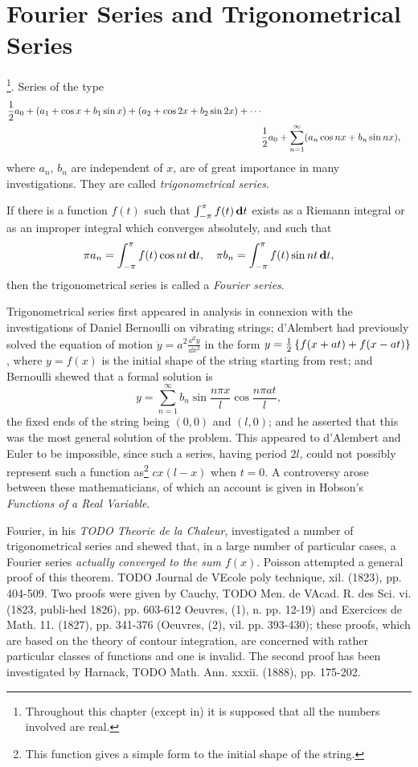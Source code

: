 %
%
\chapter{Fourier Series and Trigonometrical Series}
\footnote{Throughout
  this chapter (except in) it is supposed that all
  the numbers involved are real.}.
Series of the type
\begin{align*}
  \half a_{0}
  + (a_{1} + \cos x + b_{1} \sin x)
  + (a_{2} + \cos 2x + b_{2} \sin 2x)
  + \cdots
  \\
  &
  \hfill
  \half a_{0}
  +
  \sum_{n=1}^{\infty} ( a_{n} \cos nx + b_{n} \sin nx),
\end{align*}
where $a_{n}$, $b_{n}$ are independent of $x$, are of great importance in many
investigations. They are called \emph{trigonometrical series}.

If there is a function $f(t)$ such that
$\int_{-\pi}^{\pi} f(t) \, \mathbf{d} t$ exists as a Riemann
integral or as an improper integral which converges absolutely, and such that
$$
\pi a_{n} = \int_{-\pi}^{\pi} f(t) \cos nt \, \mathbf{d} t,
\quad
\pi b_{n} = \int_{-\pi}^{\pi} f(t) \sin nt \, \mathbf{d} t,
$$
then the trigonometrical series is called a \emph{Fourier series}.

Trigonometrical series first appeared in analysis in connexion with
the investigations of Daniel Bernoulli on vibrating strings;
d'Alembert had previously solved the equation of
motion
$ \ddot{y} = a^{2} \frac{\dd^{2} y}{\dd x^{2}}$
in the form
$y = \frac{1}{2} \left\{ f(x+at) + f(x-at) \right\}$, where $y=f(x)$ is
the initial shape of the string starting from rest;
and Bernoulli shewed that a formal solution is
$$
y
=
\sum_{n=1}^{\infty}
b_{n}
\sin \frac{n \pi x}{l}
\cos \frac{n \pi a t}{l},
$$
the fixed ends of the string being $(0,0)$ and $(l,0)$; and he asserted
that this was the most general solution of the problem. This appeared
to d'Alembert and Euler to be impossible, since such a series, having
period $2l$, could not possibly represent such a function
as\footnote{This function gives a simple form to the initial shape of the string.}
$c x (l-x)$ when $t = 0$.
A controversy arose between these mathematicians, of which
an account is given in Hobson's \emph{Functions of a Real Variable}.

Fourier, in his \emph{TODO Theorie de la Chaleur}, investigated a number of
trigonometrical series and shewed that, in a large number of
particular cases, a Fourier series \emph{actually converged to the sum $f(x)$}.
Poisson attempted a general proof of this theorem. TODO Journal de VEcole
poly technique, xil. (1823), pp. 404-509. Two proofs were given by
Cauchy, TODO Men. de VAcad. R. des Sci. vi. (1823, publi-hed 1826), pp.
603-612 Oeuvres, (1), n. pp. 12-19) and Exercices de Math. 11. (1827),
pp. 341-376 (Oeuvres, (2), vil. pp. 393-430); these proofs, which are
based on the theory of contour integration, are concerned with rather
particular classes of functions and one is invalid. The second proof
has been investigated by Harnack, TODO Math. Ann. xxxii. (1888), pp.
175-202.

